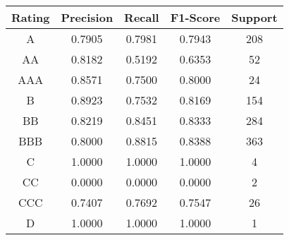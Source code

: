 \footnotesize
\begin{tabular}{ccccc}
\toprule
Rating & Precision & Recall & F1-Score & Support \\
\midrule
A & 0.7905 & 0.7981 & 0.7943 & 208 \\
AA & 0.8182 & 0.5192 & 0.6353 & 52 \\
AAA & 0.8571 & 0.7500 & 0.8000 & 24 \\
B & 0.8923 & 0.7532 & 0.8169 & 154 \\
BB & 0.8219 & 0.8451 & 0.8333 & 284 \\
BBB & 0.8000 & 0.8815 & 0.8388 & 363 \\
C & 1.0000 & 1.0000 & 1.0000 & 4 \\
CC & 0.0000 & 0.0000 & 0.0000 & 2 \\
CCC & 0.7407 & 0.7692 & 0.7547 & 26 \\
D & 1.0000 & 1.0000 & 1.0000 & 1 \\
\bottomrule
\end{tabular}

\normalsize